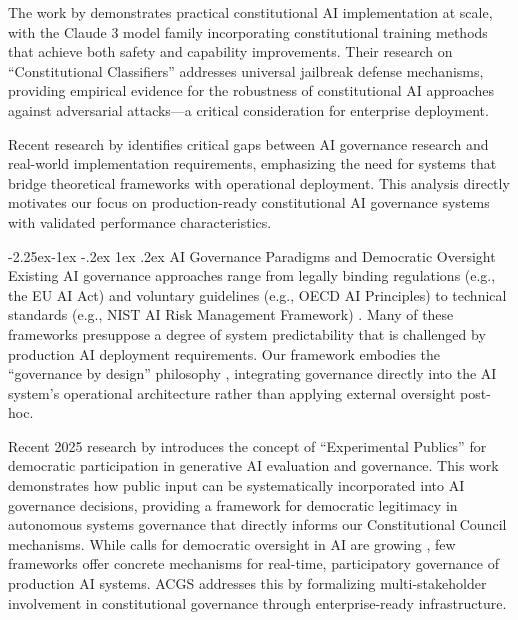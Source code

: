 \documentclass[manuscript,screen,9pt]{acmart}
\makeatletter
\renewcommand\subsection{\@startsection{subsection}{2}{\z@}%
  {-2.25ex\@plus -1ex \@minus -.2ex}%
  {1ex \@plus .2ex}%
  {\normalfont\large\bfseries}}
\makeatother
\begin{document}
The work by \citet{Anthropic2024Claude3} demonstrates practical constitutional AI implementation at scale, with the Claude 3 model family incorporating constitutional training methods that achieve both safety and capability improvements. Their research on ``Constitutional Classifiers'' \cite{Anthropic2025Constitutional} addresses universal jailbreak defense mechanisms, providing empirical evidence for the robustness of constitutional AI approaches against adversarial attacks---a critical consideration for enterprise deployment.

Recent research by \citet{SSRC2025AIGovernance} identifies critical gaps between AI governance research and real-world implementation requirements, emphasizing the need for systems that bridge theoretical frameworks with operational deployment. This analysis directly motivates our focus on production-ready constitutional AI governance systems with validated performance characteristics.

\subsection{AI Governance Paradigms and Democratic Oversight}
Existing AI governance approaches range from legally binding regulations (e.g., the EU AI Act) and voluntary guidelines (e.g., OECD AI Principles) to technical standards (e.g., NIST AI Risk Management Framework) \cite{Wynants2025ETHICAL, WorldBank2024AIGovernance, CambridgeUP2024CorporateGovernance}. Many of these frameworks presuppose a degree of system predictability that is challenged by production AI deployment requirements. Our framework embodies the ``governance by design'' philosophy \cite{Engin2025AdaptiveAIGovernance}, integrating governance directly into the AI system's operational architecture rather than applying external oversight post-hoc.

Recent 2025 research by \citet{Knight2025ExperimentalPublics} introduces the concept of ``Experimental Publics'' for democratic participation in generative AI evaluation and governance. This work demonstrates how public input can be systematically incorporated into AI governance decisions, providing a framework for democratic legitimacy in autonomous systems governance that directly informs our Constitutional Council mechanisms. While calls for democratic oversight in AI are growing \cite{Hwang2025PublicCAI}, few frameworks offer concrete mechanisms for real-time, participatory governance of production AI systems. ACGS addresses this by formalizing multi-stakeholder involvement in constitutional governance through enterprise-ready infrastructure.
\end{document}
